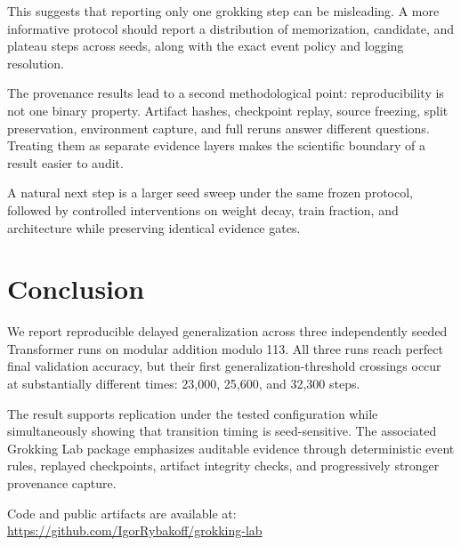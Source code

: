 \documentclass[11pt]{article}
\begin{document}
This suggests that reporting only one grokking step can be misleading. A more informative protocol should report a distribution of memorization, candidate, and plateau steps across seeds, along with the exact event policy and logging resolution.

The provenance results lead to a second methodological point: reproducibility is not one binary property. Artifact hashes, checkpoint replay, source freezing, split preservation, environment capture, and full reruns answer different questions. Treating them as separate evidence layers makes the scientific boundary of a result easier to audit.

A natural next step is a larger seed sweep under the same frozen protocol, followed by controlled interventions on weight decay, train fraction, and architecture while preserving identical evidence gates.

\section{Conclusion}
We report reproducible delayed generalization across three independently seeded Transformer runs on modular addition modulo 113. All three runs reach perfect final validation accuracy, but their first generalization-threshold crossings occur at substantially different times: 23{,}000, 25{,}600, and 32{,}300 steps.

The result supports replication under the tested configuration while simultaneously showing that transition timing is seed-sensitive. The associated Grokking Lab package emphasizes auditable evidence through deterministic event rules, replayed checkpoints, artifact integrity checks, and progressively stronger provenance capture.

Code and public artifacts are available at:
\url{https://github.com/IgorRybakoff/grokking-lab}




\appendix

\end{document}
